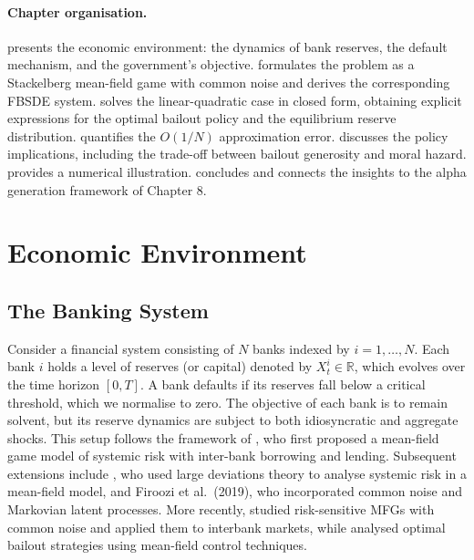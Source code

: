 \paragraph{Chapter organisation.}  presents the economic
environment: the dynamics of bank reserves, the default mechanism, and the
government's objective.  formulates the problem as a
Stackelberg mean-field game with common noise and derives the corresponding FBSDE
system.  solves the linear-quadratic case in closed form,
obtaining explicit expressions for the optimal bailout policy and the equilibrium
reserve distribution.  quantifies the $O(1/N)$ approximation error.
 discusses the policy implications, including the trade-off
between bailout generosity and moral hazard.  provides a
numerical illustration.  concludes and connects the insights
to the alpha generation framework of Chapter 8.


\section{Economic Environment}
\label{sec:sr-environment}

\subsection{The Banking System}

Consider a financial system consisting of $N$ banks indexed by $i = 1, \dots, N$.
Each bank $i$ holds a level of reserves (or capital) denoted by $X_t^i \in \mathbb{R}$,
which evolves over the time horizon $[0,T]$. A bank defaults if its reserves fall
below a critical threshold, which we normalise to zero. The objective of each bank
is to remain solvent, but its reserve dynamics are subject to both idiosyncratic and
aggregate shocks. This setup follows the framework of \citep{carmonafouquesun2015}, who first proposed a mean-field game model of systemic risk with inter-bank
borrowing and lending. Subsequent extensions include \citep{garnierpapanicolaouyang2013}, who used large deviations theory to analyse systemic risk in a mean-field
model, and Firoozi et al.\ (2019), who incorporated common noise and Markovian
latent processes. More recently, \citep{renfiroozi2024} studied risk-sensitive MFGs
with common noise and applied them to interbank markets, while \citep{cuchieroreisingerrigger2024} analysed optimal bailout strategies using mean-field control
techniques.

